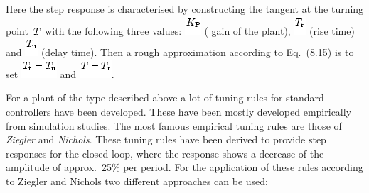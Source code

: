 \documentclass[]{article}
\begin{document}
Here the step response is characterised by constructing the
\protect\hypertarget{16260}{}{}\protect\hypertarget{16261}{}{}tangent at
the turning point
\includegraphics[width=0.14583in,height=0.13542in]{./Empirical tuning rules according to Ziegler and Nichols_files/img1243.png}
with the following three values:
\includegraphics[width=0.23958in,height=0.27083in]{./Empirical tuning rules according to Ziegler and Nichols_files/img62.png}
(\protect\hypertarget{16263}{}{} \protect\hypertarget{16264}{}{}gain of
the plant),
\includegraphics[width=0.17708in,height=0.27083in]{./Empirical tuning rules according to Ziegler and Nichols_files/img63.png}
\protect\hypertarget{16266}{}{} \protect\hypertarget{16267}{}{}(rise
time) and
\includegraphics[width=0.18750in,height=0.27083in]{./Empirical tuning rules according to Ziegler and Nichols_files/img64.png}
\protect\hypertarget{16269}{}{} \protect\hypertarget{16270}{}{}(delay
time). Then a rough approximation according to
Eq.~(\href{http://www.atp.ruhr-uni-bochum.de/rt1/syscontrol/node64.html\#eq:8.2.32}{8.15})
is to set
\includegraphics[width=0.52083in,height=0.27083in]{./Empirical tuning rules according to Ziegler and Nichols_files/img1244.png}
and
\includegraphics[width=0.46875in,height=0.27083in]{./Empirical tuning rules according to Ziegler and Nichols_files/img1245.png}.

For a plant of the type described above a lot of tuning rules for
standard controllers have been developed. These have been mostly
developed empirically from simulation studies. The most famous empirical
tuning rules are those of \emph{Ziegler} and \emph{Nichols}. These
tuning rules have been derived to provide step responses for the closed
loop, where the response shows a decrease of the amplitude of
approx.~25\% per period. For the application of these rules according to
Ziegler and Nichols two different approaches can be used:
\end{document}
